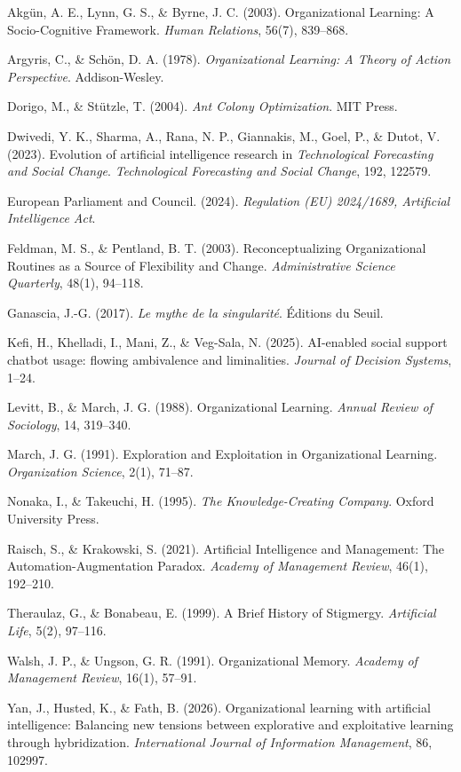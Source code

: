 \documentclass[12pt,a4paper]{article}
\begin{document}
\begin{small}
\begin{flushleft}
\setlength{\parskip}{0.4em}

Akgün, A. E., Lynn, G. S., \& Byrne, J. C. (2003). Organizational Learning: A Socio-Cognitive Framework. \textit{Human Relations}, 56(7), 839--868.

Argyris, C., \& Schön, D. A. (1978). \textit{Organizational Learning: A Theory of Action Perspective}. Addison-Wesley.

Dorigo, M., \& Stützle, T. (2004). \textit{Ant Colony Optimization}. MIT Press.

Dwivedi, Y. K., Sharma, A., Rana, N. P., Giannakis, M., Goel, P., \& Dutot, V. (2023). Evolution of artificial intelligence research in \textit{Technological Forecasting and Social Change}. \textit{Technological Forecasting and Social Change}, 192, 122579.

European Parliament and Council. (2024). \textit{Regulation (EU) 2024/1689, Artificial Intelligence Act}.

Feldman, M. S., \& Pentland, B. T. (2003). Reconceptualizing Organizational Routines as a Source of Flexibility and Change. \textit{Administrative Science Quarterly}, 48(1), 94--118.

Ganascia, J.-G. (2017). \textit{Le mythe de la singularité}. Éditions du Seuil.

Kefi, H., Khelladi, I., Mani, Z., \& Veg-Sala, N. (2025). AI-enabled social support chatbot usage: flowing ambivalence and liminalities. \textit{Journal of Decision Systems}, 1--24.

Levitt, B., \& March, J. G. (1988). Organizational Learning. \textit{Annual Review of Sociology}, 14, 319--340.

March, J. G. (1991). Exploration and Exploitation in Organizational Learning. \textit{Organization Science}, 2(1), 71--87.

Nonaka, I., \& Takeuchi, H. (1995). \textit{The Knowledge-Creating Company}. Oxford University Press.

Raisch, S., \& Krakowski, S. (2021). Artificial Intelligence and Management: The Automation-Augmentation Paradox. \textit{Academy of Management Review}, 46(1), 192--210.

Theraulaz, G., \& Bonabeau, E. (1999). A Brief History of Stigmergy. \textit{Artificial Life}, 5(2), 97--116.

Walsh, J. P., \& Ungson, G. R. (1991). Organizational Memory. \textit{Academy of Management Review}, 16(1), 57--91.

Yan, J., Husted, K., \& Fath, B. (2026). Organizational learning with artificial intelligence: Balancing new tensions between explorative and exploitative learning through hybridization. \textit{International Journal of Information Management}, 86, 102997.

\end{flushleft}
\end{small}
\end{document}
